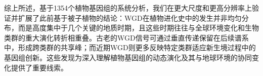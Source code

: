 综上所述，基于1354个植物基因组的系统分析，我们在更大尺度和更高分辨率上验证并扩展了此前基于被子植物的结论：WGD在植物进化史中的发生并非均匀分布，而是高度集中于几个关键的地质时期，且这些时期往往与全球环境变化和生物类群的重大演化转折相重叠。古老的WGD信号可通过垂直传递保留在后续谱系中，形成跨类群的共享峰；而近期WGD则更多反映特定类群适应新生境过程中的基因组创新。这些发现为深入理解植物基因组的动态演化及其与地球环境的协同变化提供了重要线索。








